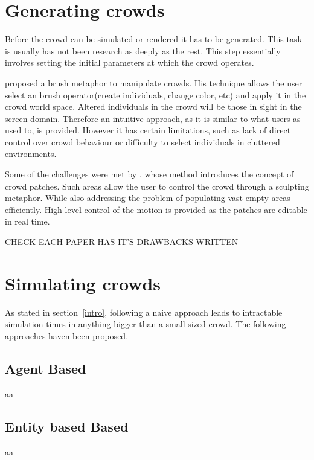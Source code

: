 \documentclass[11pt,twocolumn]{article}
\numberwithin{equation}{section} %
\numberwithin{figure}{section} %
\numberwithin{table}{section} %
\begin{document}
\section{Generating crowds}

Before the crowd can be simulated or rendered it has to be generated.
This task is usually has not been research as deeply as the rest.
This step essentially involves setting the initial parameters at which the crowd operates.

\cite{Ulicny2004} proposed a brush metaphor to manipulate crowds.
His technique allows the user select an brush operator(create individuals, change color, etc) and apply it in the crowd world space.
Altered individuals in the crowd will be those in sight in the screen domain.
Therefore an intuitive approach, as it is similar to what users as used to, is provided.
However it has certain limitations, such as lack of direct control over crowd behaviour or difficulty to select individuals in cluttered environments.

Some of the challenges were met by \cite{Jordao2014}, whose method introduces the concept of crowd patches.
Such areas allow the user to control the crowd through a sculpting metaphor.
While also addressing the problem of populating vast empty areas efficiently.
High level control of the motion is provided as the patches are editable in real time.

CHECK EACH PAPER HAS IT'S DRAWBACKS WRITTEN

\section{Simulating crowds}

As stated in section~\ref{intro}, following a naive approach leads to intractable simulation times in anything bigger than a small sized crowd.
The following approaches haven been proposed.

\subsection{Agent Based}

aa

\subsection{Entity based Based}

aa
\end{document}
